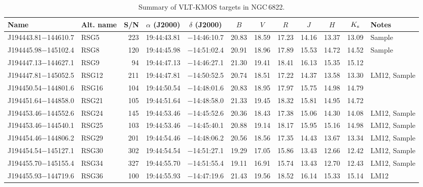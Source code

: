 \documentclass[iop]{emulateapj}
\begin{document}
\begin{table*}
\caption{
        Summary of VLT-KMOS targets in NGC\,6822.\label{tb:obs-params}
        }
\scriptsize
\begin{center}
\begin{tabular}{llrccccccccl}
 \hline
 \hline
Name & Alt. name & S/N & $\alpha$ (J2000) & $\delta$ (J2000) & $B$ & $V$ & $R$ & $J$ & $H$ & $K_{\rm s}$ & Notes \\
 \hline
J194443.81$-$144610.7  &  RSG5   & 223 &   19:44:43.81  &  $-$14:46:10.7  &  20.83  &  18.59  &  17.23  &  14.16  &  13.37  &  13.09 & Sample\\
J194445.98$-$145102.4  &  RSG8   & 120 &   19:44:45.98  &  $-$14:51:02.4  &  20.91  &  18.96  &  17.89  &  15.53  &  14.72  &  14.52 & Sample\\
J194447.13$-$144627.1  &  RSG9   &  94 &   19:44:47.13  &  $-$14:46:27.1  &  21.30  &  19.41  &  18.41  &  16.13  &  15.35  &  15.12 \\
J194447.81$-$145052.5  &  RSG12  & 211 &   19:44:47.81  &  $-$14:50:52.5  &  20.74  &  18.51  &  17.22  &  14.37  &  13.58  &  13.30 & LM12, Sample \\
J194450.54$-$144801.6  &  RSG16  & 104 &   19:44:50.54  &  $-$14:48:01.6  &  20.83  &  18.95  &  17.97  &  15.75  &  14.98  &  14.79 \\
J194451.64$-$144858.0  &  RSG21  & 105 &   19:44:51.64  &  $-$14:48:58.0  &  21.33  &  19.45  &  18.32  &  15.81  &  14.95  &  14.72 \\
J194453.46$-$144552.6  &  RSG24  & 145 &   19:44:53.46  &  $-$14:45:52.6  &  20.36  &  18.43  &  17.38  &  15.06  &  14.30  &  14.08 & LM12, Sample \\
J194453.46$-$144540.1  &  RSG25  & 103 &   19:44:53.46  &  $-$14:45:40.1  &  20.88  &  19.14  &  18.17  &  15.95  &  15.16  &  14.98 & LM12, Sample \\
J194454.46$-$144806.2  &  RSG29  & 201 &   19:44:54.46  &  $-$14:48:06.2  &  20.56  &  18.56  &  17.35  &  14.43  &  13.67  &  13.34 & LM12, Sample\\
J194454.54$-$145127.1  &  RSG30  & 302 &   19:44:54.54  &  $-$14:51:27.1  &  19.29  &  17.05  &  15.86  &  13.43  &  12.66  &  12.42 & LM12, Sample \\
J194455.70$-$145155.4  &  RSG34  & 327 &   19:44:55.70  &  $-$14:51:55.4  &  19.11  &  16.91  &  15.74  &  13.43  &  12.70  &  12.43 & LM12, Sample \\
J194455.93$-$144719.6  &  RSG36  & 100 &   19:44:55.93  &  $-$14:47:19.6  &  21.43  &  19.56  &  18.52  &  16.14  &  15.33  &  15.14 & LM12 \\

\end{tabular}
\end{center}
\end{table*}
\end{document}
